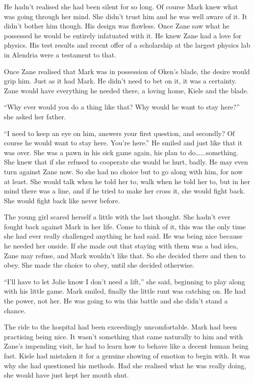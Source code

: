 He hadn't realised she had been silent for so long.  Of course Mark knew what was going through her mind.  She didn't trust him and he was well aware of it.  It didn't bother him though.  His design was flawless.  Once Zane saw what he possessed he would be entirely infatuated with it.  He knew Zane had a love for physics.  His test results and recent offer of a scholarship at the largest physics lab in Alendria were a testament to that.  

Once Zane realised that Mark was in possession of Oken's blade, the desire would grip him.  Just as it had Mark.  He didn't need to bet on it, it was a certainty.  Zane would have everything he needed there, a loving home, Kiele and the blade.

``Why ever would you do a thing like that?  Why would he want to stay here?'' she asked her father.

``I need to keep an eye on him, answers your first question, and secondly?  Of course he would want to stay here.  You're here.''  He smiled and just like that it was over.  She was a pawn in his sick game again, his plan to do…...something.  She knew that if she refused to cooperate she would be hurt, badly.  He may even turn against Zane now.  So she had no choice but to go along with him, for now at least.  She would talk when he told her to, walk when he told her to, but in her mind there was a line, and if he tried to make her cross it, she would fight back.  She would fight back like never before.

The young girl scared herself a little with the last thought.  She hadn't ever fought back against Mark in her life.  Come to think of it, this was the only time she had ever really challenged anything he had said.  He was being nice because he needed her onside.  If she made out that staying with them was a bad idea, Zane may refuse, and Mark wouldn't like that. So she decided there and then to obey.  She made the choice to obey, until she decided otherwise.

``I'll have to let Jolie know I don't need a lift,'' she said, beginning to play along with his little game.  Mark smiled, finally the little runt was catching on.  He had the power, not her.  He was going to win this battle and she didn't stand a chance.



\thoughtbreak



The ride to the hospital had been exceedingly uncomfortable.  Mark had been practising being nice.  It wasn't something that came naturally to him and with Zane's impending visit, he had to learn how to behave like a decent human being fast.  Kiele had mistaken it for a genuine showing of emotion to begin with.  It was why she had questioned his methods.  Had she realised what he was really doing, she would have just kept her mouth shut.

